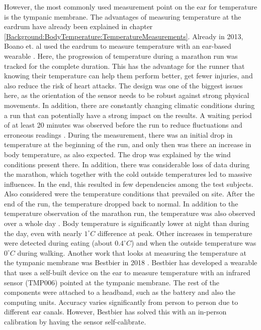 However, the most commonly used measurement point on the ear for temperature is the tympanic membrane. 
The advantages of measuring temperature at the eardrum have already been explained in chapter \ref{Background:BodyTemperature:TemperatureMeasurements}.
Already in 2013, Boano et. al used the eardrum to measure temperature with an ear-based wearable \cite{boanoNoninvasiveMeasurementCore2013}. 
Here, the progression of temperature during a marathon run was tracked for the complete duration.
This has the advantage for the runner that knowing their temperature can help them perform better, get fewer injuries, and also reduce the risk of heart attacks.
The design was one of the biggest issues here, as the orientation of the sensor needs to be robust against strong physical movements.
In addition, there are constantly changing climatic conditions during a run that can potentially have a strong impact on the results.
A waiting period of at least 20 minutes was observed before the run to reduce fluctuations and erroneous readings \cite{chagllae.MeasurementCoreBody2018}.
During the measurement, there was an initial drop in temperature at the beginning of the run, and only then was there an increase in body temperature, as also expected.
The drop was explained by the wind conditions present there.
In addition, there was considerable loss of data during the marathon, which together with the cold outside temperatures led to massive influences. 
In the end, this resulted in few dependencies among the test subjects.
Also considered were the temperature conditions that prevailed on site. 
After the end of the run, the temperature dropped back to normal.
In addition to the temperature observation of the marathon run, the temperature was also observed over a whole day \cite{boanoNoninvasiveMeasurementCore2013}.
Body temperature is significantly lower at night than during the day, even with nearly $1 ^\circ C$ difference at peak.
Other increases in temperature were detected during eating (about $0.4 ^\circ C$) and when the outside temperature was $0 ^\circ C$ during walking.
Another work that looks at measuring the temperature at the tympanic membrane was Bestbier in 2018 \cite{bestbierDevelopmentVitalSigns2018}.
Bestbier has developed a wearable that uses a self-built device on the ear to measure temperature with an infrared sensor (TMP006) pointed at the tympanic membrane.
The rest of the components were attached to a headband, such as the battery and also the computing units.
Accuracy varies significantly from person to person due to different ear canals.
However, Bestbier has solved this with an in-person calibration by having the sensor self-calibrate.
